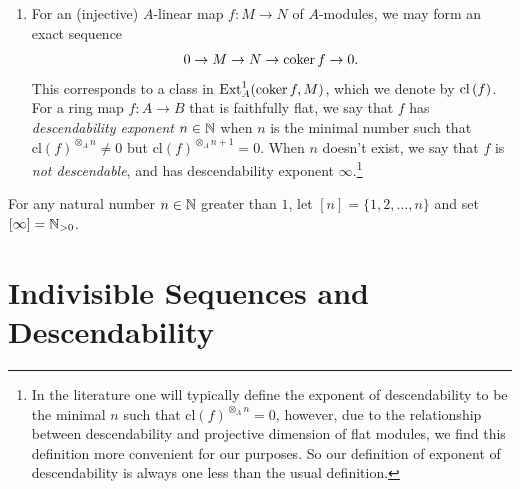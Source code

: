 \begin{enumerate}
\item[(v)] For an (injective) $A$-linear map $f: M \to N$ of $A$-modules, we may form an exact sequence 
\[0 \rightarrow M \rightarrow N \rightarrow \operatorname{coker}{f} \rightarrow 0.\]
This corresponds to a class in $\operatorname{Ext}^1_A(\operatorname{coker}{f}, M)$, which we denote by $\mathrm{cl}\left(f\right)$.\\
\indent For a ring map $f: A \to B$ that is faithfully flat, we say that $f$ has \textit{descendability exponent $n \in \mathbb{N}$} 
when $n$ is the minimal number such that $\text{cl}(f)^{\otimes_A n} \neq 0$ but $\text{cl}(f)^{\otimes_A n+1} = 0$. 
When $n$ doesn't exist, we say that $f$ is \textit{not descendable}, and has descendability exponent $\infty$.\footnote{In the literature one will typically define the exponent of descendability to be the minimal $n$ such that $\text{cl}(f)^{\otimes_A n} = 0$, 
however, due to the relationship between descendability and projective dimension of flat modules, we find this definition more convenient for our purposes. 
So our definition of exponent of descendability is always one less than the usual definition.}
\end{enumerate}
For any natural number $n \in \mathbb{N}$ greater than $1$, let $[n] = \{1,2,...,n\}$ and set $[\infty] = \mathbb{N}_{> 0}$.

\section{Indivisible Sequences and Descendability}

